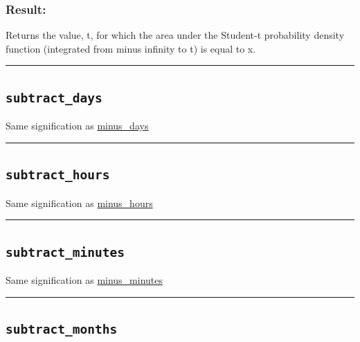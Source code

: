 \documentclass[]{book}
\theoremstyle{definition}
\theoremstyle{definition}
\theoremstyle{definition}
\theoremstyle{remark}
\begin{document}
\subsubsection{Result:}\label{result-490}

Returns the value, t, for which the area under the Student-t probability
density function (integrated from minus infinity to t) is equal to x.

\begin{center}\rule{0.5\linewidth}{\linethickness}\end{center}

\subsection{\texorpdfstring{\texttt{subtract\_days}}{subtract\_days}}\label{subtract_days}

Same signification as
\href{operators-i-to-m.html\#minus_days}{minus\_days}

\begin{center}\rule{0.5\linewidth}{\linethickness}\end{center}

\subsection{\texorpdfstring{\texttt{subtract\_hours}}{subtract\_hours}}\label{subtract_hours}

Same signification as
\href{operators-i-to-m.html\#minus_hours}{minus\_hours}

\begin{center}\rule{0.5\linewidth}{\linethickness}\end{center}

\subsection{\texorpdfstring{\texttt{subtract\_minutes}}{subtract\_minutes}}\label{subtract_minutes}

Same signification as
\href{operators-i-to-m.html\#minus_minutes}{minus\_minutes}

\begin{center}\rule{0.5\linewidth}{\linethickness}\end{center}

\subsection{\texorpdfstring{\texttt{subtract\_months}}{subtract\_months}}\label{subtract_months}
\end{document}
